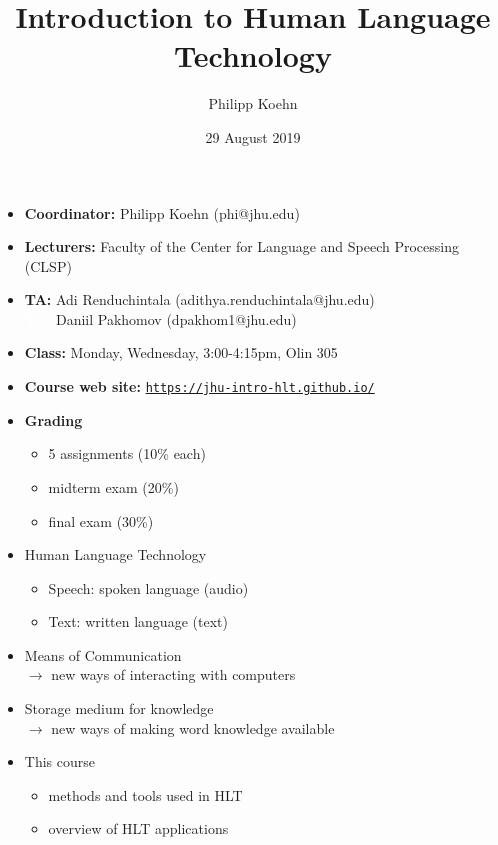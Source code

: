 \documentclass[landscape]{jhuslides3C}
\begin{document}
\rm
\title[Introduction to Human Language Technology: Introduction]{Introduction to Human Language Technology}
\author[Philipp Koehn]{Philipp Koehn}
\date{29 August 2019}
\maketitle


\vfill
\begin{itemize} \itemsep 0mm
\item \textbf{Coordinator:} Philipp Koehn (phi@jhu.edu)
\item \textbf{Lecturers:} Faculty of the Center for Language and Speech Processing (CLSP)
\item \textbf{TA:} Adi Renduchintala (adithya.renduchintala@jhu.edu)\\
\textcolor{white}{\textbf{TA:}} Daniil Pakhomov (dpakhom1@jhu.edu)
\item \textbf{Class:} Monday, Wednesday, 3:00-4:15pm, Olin 305
\item \textbf{Course web site:} \href{https://jhu-intro-hlt.github.io/}{\tt https://jhu-intro-hlt.github.io/}
\item \textbf{Grading} \vspace{-3mm}
\begin{itemize}
\item 5 assignments (10\% each)
\item midterm exam (20\%)
\item final exam (30\%)
\end{itemize}
\end{itemize}
\vfill


\vfill
\begin{itemize}
\item Human Language Technology
\begin{itemize}
\item Speech: spoken language (audio)
\item Text: written language (text)
\end{itemize}
\item Means of Communication\\
$\rightarrow$ new ways of interacting with computers
\item Storage medium for knowledge\\
$\rightarrow$ new ways of making word knowledge available
\item This course
\begin{itemize}
\item methods and tools used in HLT
\item overview of HLT applications
\end{itemize}
\end{itemize}
\vfill
\end{document}

